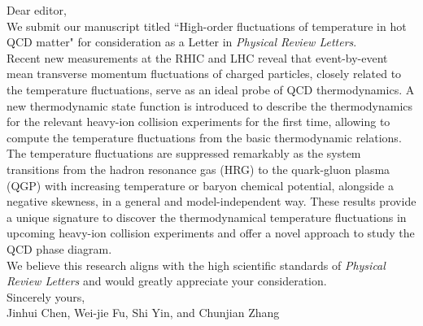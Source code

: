 \documentclass[a4paper,11pt, oneside,titlepage]{article}
\begin{document}

\pagestyle{empty} 





\noindent Dear editor,\\[-1ex]


\noindent We submit our manuscript titled ``High-order fluctuations of temperature in hot QCD matter" for consideration as a Letter in \textit{Physical Review Letters}. 
\\

\noindent Recent new measurements at the RHIC and LHC reveal that event-by-event mean transverse momentum fluctuations of charged particles, closely related to the temperature fluctuations, serve as an ideal probe of QCD thermodynamics. A new thermodynamic state function is introduced to describe the thermodynamics for the relevant heavy-ion collision experiments for the first time, allowing to compute the temperature fluctuations from the basic thermodynamic relations. The temperature fluctuations are suppressed remarkably as the system transitions from the hadron resonance gas (HRG) to the quark-gluon plasma (QGP) with increasing temperature or baryon chemical potential, alongside a negative skewness, in a general and model-independent way. These results provide a unique signature to discover
the thermodynamical temperature fluctuations in upcoming heavy-ion collision experiments and offer a novel approach to study the QCD phase diagram.\\


\noindent We believe this research aligns with the high scientific standards of \textit{Physical Review Letters} and would greatly appreciate your consideration.\\




\noindent Sincerely yours, \\[0.3ex]

\noindent Jinhui Chen, Wei-jie Fu, Shi Yin, and Chunjian Zhang

\noindent 




\end{document}
